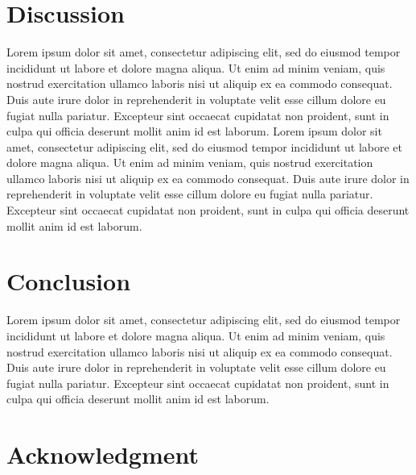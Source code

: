 \documentclass[journal,twoside,web]{ieeecolor}
\begin{document}
\section{Discussion}
\label{sec:next steps}
Lorem ipsum dolor sit amet, consectetur adipiscing elit, sed do eiusmod tempor incididunt ut labore et dolore magna aliqua. Ut enim ad minim veniam, 
quis nostrud exercitation ullamco laboris nisi ut aliquip ex ea commodo consequat. Duis aute irure dolor in reprehenderit in voluptate velit esse 
cillum dolore eu fugiat nulla pariatur. Excepteur sint occaecat cupidatat non proident, sunt in culpa qui officia deserunt mollit anim id est laborum.
Lorem ipsum dolor sit amet, consectetur adipiscing elit, sed do eiusmod tempor incididunt ut labore et dolore magna aliqua. Ut enim ad minim veniam, 
quis nostrud exercitation ullamco laboris nisi ut aliquip ex ea commodo consequat. Duis aute irure dolor in reprehenderit in voluptate velit esse cillum 
dolore eu fugiat nulla pariatur. Excepteur sint occaecat cupidatat non proident, sunt in culpa qui officia deserunt mollit anim id est laborum.

\section{Conclusion}
\label{sec:conclusion}
Lorem ipsum dolor sit amet, consectetur adipiscing elit, sed do eiusmod tempor incididunt ut labore et dolore magna aliqua. Ut enim ad minim veniam, 
quis nostrud exercitation ullamco laboris nisi ut aliquip ex ea commodo consequat. Duis aute irure dolor in reprehenderit in voluptate velit esse 
cillum dolore eu fugiat nulla pariatur. Excepteur sint occaecat cupidatat non proident, sunt in culpa qui officia deserunt mollit anim id est laborum.

\section*{Acknowledgment}
\end{document}

